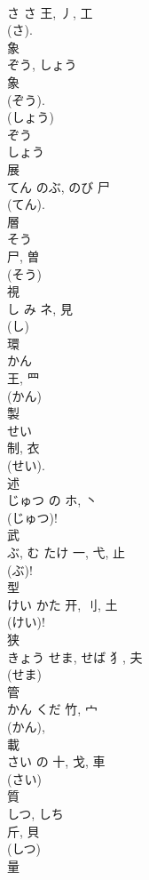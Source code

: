 \documentclass[8pt]{extreport}
\begin{document}
\begin{CJK}{UTF8}{min}
\\	さ	さ	王, 丿, 工		
\\	(さ).	
\\	象	
\\	ぞう, しょう	
\\	象	
\\	(ぞう). 
\\	(しょう) 
\\	ぞう 
\\	しょう 
\\	展	
\\	てん	のぶ, のび	尸	
\\	(てん). 
\\	層	
\\	そう	
\\	尸, 曽	
\\	(そう) 
\\	視	
\\	し	み	ネ, 見	
\\	(し) 
\\	環	
\\	かん	
\\	王, 罒		
\\	(かん) 
\\	製	
\\	せい	
\\	制, 衣	
\\	(せい). 
\\	述	
\\	じゅつ	の	ホ, 丶		
\\	(じゅつ)!
\\	武	
\\	ぶ, む	たけ	一, 弋, 止	
\\	(ぶ)!	
\\	型	
\\	けい	かた	开, 刂, 土	
\\	(けい)! 
\\	狭	
\\	きょう	せま, せば	犭, 夫		
\\	(せま) 
\\	管	
\\	かん	くだ	竹, 宀		
\\	(かん), 
\\	載	
\\	さい	の	十, 戈, 車	
\\	(さい) 
\\	質	
\\	しつ, しち	
\\	斤, 貝	
\\	(しつ) 
\\	量	

\end{CJK}
\end{document}
